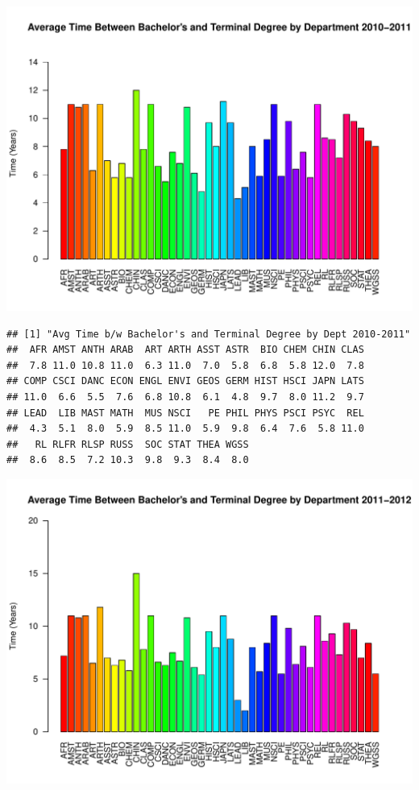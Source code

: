 \documentclass[12pt,a4paper]{article}\usepackage[]{graphicx}\usepackage[]{color}
\makeatletter
\def\maxwidth{ %
  \ifdim\Gin@nat@width>\linewidth
    \linewidth
  \else
    \Gin@nat@width
  \fi
}
\newenvironment{kframe}{%
 \def\at@end@of@kframe{}%
 \ifinner\ifhmode%
  \def\at@end@of@kframe{\end{minipage}}%
  \begin{minipage}{\columnwidth}%
 \fi\fi%
 \def\FrameCommand##1{\hskip\@totalleftmargin \hskip-\fboxsep
 \colorbox{shadecolor}{##1}\hskip-\fboxsep
     \hskip-\linewidth \hskip-\@totalleftmargin \hskip\columnwidth}%
 \MakeFramed {\advance\hsize-\width
   \@totalleftmargin\z@ \linewidth\hsize
   \@setminipage}}%
 {\par\unskip\endMakeFramed%
 \at@end@of@kframe}
\newenvironment{knitrout}{}{} %
\theoremstyle{definition}
\makeatother
\begin{document}
\begin{knitrout}
\includegraphics[width=\maxwidth]{figure/unnamed-chunk-13-7} 
\begin{kframe}\begin{verbatim}
## [1] "Avg Time b/w Bachelor's and Terminal Degree by Dept 2010-2011"
##  AFR AMST ANTH ARAB  ART ARTH ASST ASTR  BIO CHEM CHIN CLAS 
##  7.8 11.0 10.8 11.0  6.3 11.0  7.0  5.8  6.8  5.8 12.0  7.8 
## COMP CSCI DANC ECON ENGL ENVI GEOS GERM HIST HSCI JAPN LATS 
## 11.0  6.6  5.5  7.6  6.8 10.8  6.1  4.8  9.7  8.0 11.2  9.7 
## LEAD  LIB MAST MATH  MUS NSCI   PE PHIL PHYS PSCI PSYC  REL 
##  4.3  5.1  8.0  5.9  8.5 11.0  5.9  9.8  6.4  7.6  5.8 11.0 
##   RL RLFR RLSP RUSS  SOC STAT THEA WGSS 
##  8.6  8.5  7.2 10.3  9.8  9.3  8.4  8.0
\end{verbatim}
\end{kframe}
\includegraphics[width=\maxwidth]{figure/unnamed-chunk-13-8} 

\end{knitrout}
\end{document}
